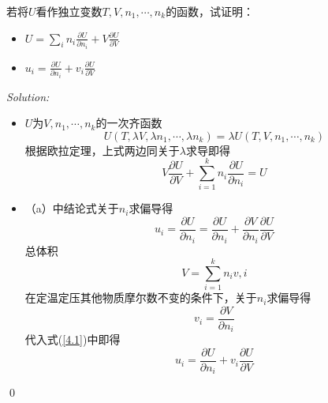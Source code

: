 \documentclass[12pt,a4paper]{article}
\newenvironment{problem}[2][Problem]{\begin{trivlist}
\item[\hskip \labelsep {\bfseries #1}\hskip \labelsep {\bfseries #2.}]}{\end{trivlist}}
\newenvironment{sol}
    {\emph{Solution:}
    }
    {
    \qed
    }
\begin{document}
\begin{problem}{4.1}
若将$U$看作独立变数$T,V,n_1,\cdots,n_k$的函数，试证明：
\begin{itemize}
\item[（a）] $U=\sum_in_i\frac{\partial U}{\partial n_i}+V\frac{\partial U}{\partial V}$
\item[（b）] $u_i=\frac{\partial U}{\partial n_i}+v_i\frac{\partial U}{\partial V}$
\end{itemize}
\end{problem}
\begin{sol}
\begin{itemize}
\item[（a）] $U$为$V,n_1,\cdots,n_k$的一次齐函数
\begin{equation}
U(T,\lambda V,\lambda n_1,\cdots,\lambda n_k)=\lambda U(T,V,n_1,\cdots,n_k)
\end{equation}
根据欧拉定理，上式两边同关于$\lambda$求导即得
\begin{equation}
V\frac{\partial U}{\partial V}+\sum_{i=1}^kn_i\frac{\partial U}{\partial n_i}=U
\end{equation}
\item[（b）] （a）中结论式关于$n_i$求偏导得
\begin{equation}
\label{4.1}u_i=\frac{\partial U}{\partial n_i}=\frac{\partial U}{\partial n_i}+\frac{\partial V}{\partial n_i}\frac{\partial U}{\partial V}
\end{equation}
总体积
\begin{equation}
V=\sum_{i=1}^kn_iv,i
\end{equation}
在定温定压其他物质摩尔数不变的条件下，关于$n_i$求偏导得
\begin{equation}
v_i=\frac{\partial V}{\partial n_i}
\end{equation}
代入式(\ref{4.1})中即得
\begin{equation}
u_i=\frac{\partial U}{\partial n_i}+v_i\frac{\partial U}{\partial V}
\end{equation}
\end{itemize}
\end{sol}
\end{document}
